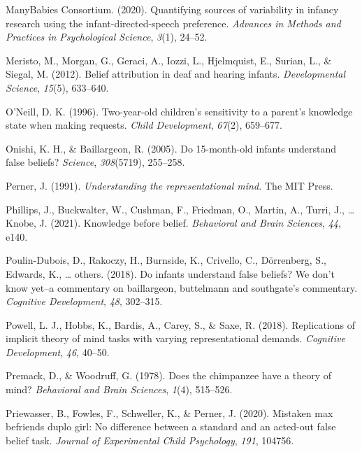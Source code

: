 \documentclass[
  english,
  man,floatsintext]{apa6}
\newlength{\cslhangindent}
\newlength{\cslentryspacingunit} %
\newenvironment{CSLReferences}[2] %
 {%
  \setlength{\parindent}{0pt}
  \ifodd #1
  \let\oldpar\par
  \def\par{\hangindent=\cslhangindent\oldpar}
  \fi
  \setlength{\parskip}{#2\cslentryspacingunit}
 }%
 {}
\begin{document}
\begin{CSLReferences}{1}{0}
\leavevmode{}%
ManyBabies Consortium. (2020). Quantifying sources of variability in infancy research using the infant-directed-speech preference. \emph{Advances in Methods and Practices in Psychological Science}, \emph{3}(1), 24--52.

\leavevmode{}%
Meristo, M., Morgan, G., Geraci, A., Iozzi, L., Hjelmquist, E., Surian, L., \& Siegal, M. (2012). Belief attribution in deaf and hearing infants. \emph{Developmental Science}, \emph{15}(5), 633--640.

\leavevmode{}%
O'Neill, D. K. (1996). Two-year-old children's sensitivity to a parent's knowledge state when making requests. \emph{Child Development}, \emph{67}(2), 659--677.

\leavevmode{}%
Onishi, K. H., \& Baillargeon, R. (2005). Do 15-month-old infants understand false beliefs? \emph{Science}, \emph{308}(5719), 255--258.

\leavevmode{}%
Perner, J. (1991). \emph{Understanding the representational mind.} The MIT Press.

\leavevmode{}%
Phillips, J., Buckwalter, W., Cushman, F., Friedman, O., Martin, A., Turri, J., \ldots{} Knobe, J. (2021). Knowledge before belief. \emph{Behavioral and Brain Sciences}, \emph{44}, e140.

\leavevmode{}%
Poulin-Dubois, D., Rakoczy, H., Burnside, K., Crivello, C., Dörrenberg, S., Edwards, K., \ldots{} others. (2018). Do infants understand false beliefs? We don't know yet--a commentary on baillargeon, buttelmann and southgate's commentary. \emph{Cognitive Development}, \emph{48}, 302--315.

\leavevmode{}%
Powell, L. J., Hobbs, K., Bardis, A., Carey, S., \& Saxe, R. (2018). Replications of implicit theory of mind tasks with varying representational demands. \emph{Cognitive Development}, \emph{46}, 40--50.

\leavevmode{}%
Premack, D., \& Woodruff, G. (1978). Does the chimpanzee have a theory of mind? \emph{Behavioral and Brain Sciences}, \emph{1}(4), 515--526.

\leavevmode{}%
Priewasser, B., Fowles, F., Schweller, K., \& Perner, J. (2020). Mistaken max befriends duplo girl: No difference between a standard and an acted-out false belief task. \emph{Journal of Experimental Child Psychology}, \emph{191}, 104756.


\end{CSLReferences}
\end{document}

